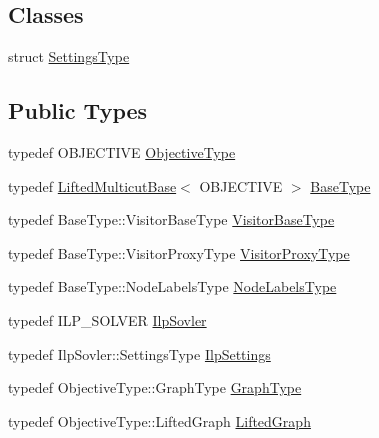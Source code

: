 \subsection*{Classes}
\begin{DoxyCompactItemize}
\item 
struct \hyperlink{structnifty_1_1graph_1_1opt_1_1lifted__multicut_1_1LiftedMulticutIlp_1_1SettingsType}{Settings\+Type}
\end{DoxyCompactItemize}
\subsection*{Public Types}
\begin{DoxyCompactItemize}
\item 
typedef O\+B\+J\+E\+C\+T\+I\+VE \hyperlink{classnifty_1_1graph_1_1opt_1_1lifted__multicut_1_1LiftedMulticutIlp_a4c1ed011eb6ea9ec5845249bc94869c8}{Objective\+Type}
\item 
typedef \hyperlink{classnifty_1_1graph_1_1opt_1_1lifted__multicut_1_1LiftedMulticutBase}{Lifted\+Multicut\+Base}$<$ O\+B\+J\+E\+C\+T\+I\+VE $>$ \hyperlink{classnifty_1_1graph_1_1opt_1_1lifted__multicut_1_1LiftedMulticutIlp_a29168294e72e012961d3ff70fa1f517c}{Base\+Type}
\item 
typedef Base\+Type\+::\+Visitor\+Base\+Type \hyperlink{classnifty_1_1graph_1_1opt_1_1lifted__multicut_1_1LiftedMulticutIlp_a6ac1e4783a7442ae1ff633dd5f008804}{Visitor\+Base\+Type}
\item 
typedef Base\+Type\+::\+Visitor\+Proxy\+Type \hyperlink{classnifty_1_1graph_1_1opt_1_1lifted__multicut_1_1LiftedMulticutIlp_a9a60777868ec5f368f3dbf7d65cec65c}{Visitor\+Proxy\+Type}
\item 
typedef Base\+Type\+::\+Node\+Labels\+Type \hyperlink{classnifty_1_1graph_1_1opt_1_1lifted__multicut_1_1LiftedMulticutIlp_a05df928d48fd5cd43241c999314aa92f}{Node\+Labels\+Type}
\item 
typedef I\+L\+P\+\_\+\+S\+O\+L\+V\+ER \hyperlink{classnifty_1_1graph_1_1opt_1_1lifted__multicut_1_1LiftedMulticutIlp_ab48b6e3d9fda7d7fa6c6929bc0c25040}{Ilp\+Sovler}
\item 
typedef Ilp\+Sovler\+::\+Settings\+Type \hyperlink{classnifty_1_1graph_1_1opt_1_1lifted__multicut_1_1LiftedMulticutIlp_af8d52d69e1ff05b34c3ef7b52d63388c}{Ilp\+Settings}
\item 
typedef Objective\+Type\+::\+Graph\+Type \hyperlink{classnifty_1_1graph_1_1opt_1_1lifted__multicut_1_1LiftedMulticutIlp_a0cfe042d75a75472055a37392518facf}{Graph\+Type}
\item 
typedef Objective\+Type\+::\+Lifted\+Graph \hyperlink{classnifty_1_1graph_1_1opt_1_1lifted__multicut_1_1LiftedMulticutIlp_a417a3bc36e6199141e528e00f9f0e27b}{Lifted\+Graph}
\end{DoxyCompactItemize}
